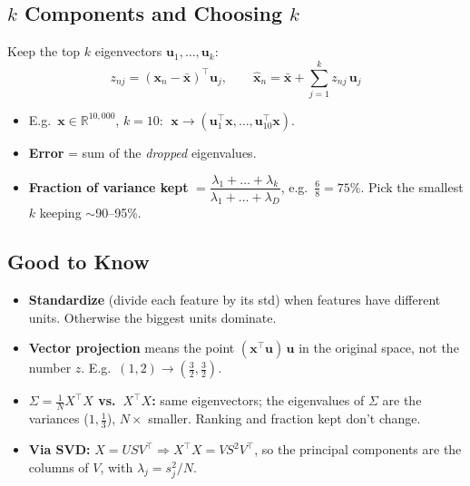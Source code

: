 \subsection*{$k$ Components and Choosing $k$}
Keep the top $k$ eigenvectors $\mathbf{u}_1, \dots, \mathbf{u}_k$:
\[
z_{nj} = (\mathbf{x}_n - \bar{\mathbf{x}})^\top \mathbf{u}_j,
\qquad
\hat{\mathbf{x}}_n = \bar{\mathbf{x}} + \sum_{j=1}^k z_{nj}\,\mathbf{u}_j
\]
\begin{itemize}
  \item E.g.\ $\mathbf{x} \in \mathbb{R}^{10{,}000}$, $k = 10$: $\;\mathbf{x} \to (\mathbf{u}_1^\top\mathbf{x}, \dots, \mathbf{u}_{10}^\top\mathbf{x})$.
  \item \textbf{Error} = sum of the \emph{dropped} eigenvalues.
  \item \textbf{Fraction of variance kept} $= \dfrac{\lambda_1 + \dots + \lambda_k}{\lambda_1 + \dots + \lambda_D}$, e.g.\ $\frac{6}{8} = 75\%$. Pick the smallest $k$ keeping $\sim$90--95\%.
\end{itemize}

\subsection*{Good to Know}
\begin{itemize}
  \item \textbf{Standardize} (divide each feature by its std) when features have different units. Otherwise the biggest units dominate.
  \item \textbf{Vector projection} means the point $(\mathbf{x}^\top\mathbf{u})\,\mathbf{u}$ in the original space, not the number $z$. E.g.\ $(1,2) \to (\frac32, \frac32)$.
  \item \textbf{$\Sigma = \frac1N X^\top X$ vs.\ $X^\top X$:} same eigenvectors; the eigenvalues of $\Sigma$ are the variances ($1, \frac13$), $N\times$ smaller. Ranking and fraction kept don't change.
  \item \textbf{Via SVD:} $X = U S V^\top \Rightarrow X^\top X = V S^2 V^\top$, so the principal components are the columns of $V$, with $\lambda_j = s_j^2/N$.
\end{itemize}
